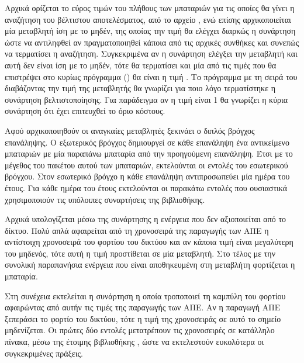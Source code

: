 \documentclass[12pt]{report}
\begin{document}
Αρχικά ορίζεται το εύρος τιμών του πλήθους των μπαταριών για τις οποίες θα γίνει η αναζήτηση του βέλτιστου αποτελέσματος, από το αρχείο {}, ενώ επίσης αρχικοποιείται μία μεταβλητή {} ίση με το 
μηδέν, της οποίας την τιμή θα ελέγχει διαρκώς η συνάρτηση ώστε να αντιληφθεί αν
πραγματοποιηθεί κάποια από τις αρχικές συνθήκες και συνεπώς να τερματίσει η αναζήτηση. Συγκεκριμένα αν η συνάρτηση ελέγξει την μεταβλητή και αυτή δεν είναι ίση με το μηδέν, τότε θα τερματίσει και μία από τις τιμές
που θα επιστρέψει στο κυρίως πρόγραμμα ({}) θα είναι η τιμή {}. Το πρόγραμμα με τη σειρά του διαβάζοντας την τιμή της μεταβλητής θα γνωρίζει για ποιο λόγο τερματίστηκε η συνάρτηση βελτιστοποίησης.
Για παράδειγμα αν η τιμή είναι 1 θα γνωρίζει η κύρια συνάρτηση ότι έχει επιτευχθεί το όριο κόστους.

Αφού αρχικοποιηθούν οι αναγκαίες μεταβλητές ξεκινάει ο διπλός βρόγχος επανάληψης. Ο εξωτερικός βρόγχος δημιουργεί σε κάθε επανάληψη ένα αντικείμενο μπαταριών με μία παραπάνω μπαταρία από την προηγούμενη επανάληψη. Έτσι με το μέγεθος
του πακέτου αυτού των μπαταριών, εκτελούνται οι εντολές του εσωτερικού βρόγχου. Στον εσωτερικό βρόγχο η κάθε επανάληψη αντιπροσωπεύει μία ημέρα του έτους. Για κάθε ημέρα του έτους εκτελούνται οι παρακάτω εντολές που ουσιαστικά 
χρησιμοποιούν τις υπόλοιπες συναρτήσεις της βιβλιοθήκης.

Αρχικά υπολογίζεται μέσω της συνάρτησης {\textbf{{}}} η ενέργεια που δεν αξιοποιείται από το δίκτυο. Πολύ απλά αφαιρείται από τη χρονοσειρά της παραγωγής των ΑΠΕ η αντίστοιχη χρονοσειρά του φορτίου του δικτύου
και αν κάποια τιμή είναι μεγαλύτερη του μηδενός, τότε αυτή η τιμή προστίθεται σε μία μεταβλητή. Στο τέλος με την συνολική παραπανήσια ενέργεια που είναι αποθηκευμένη στη μεταβλήτη φορτίζεται η μπαταρία.

{}

Στη συνέχεια εκτελείται η συνάρτηση {\textbf{{}}} η οποία τροποποιεί τη καμπύλη του φορτίου αφαιρώντας από αυτήν τις τιμές της παραγωγής των ΑΠΕ. Αν η παραγωγή ΑΠΕ ξεπεράσει το φορτίο του δικτύου, τότε η τιμή της 
χρονοσειράς σε αυτό το σημείο μηδενίζεται. Οι πρώτες δύο εντολές μετατρέπουν τις χρονοσειρές σε κατάλληλο πίνακα, μέσω της έτοιμης βιβλιοθήκης {}, ώστε να εκτελεστούν ευκολότερα οι συγκεκριμένες πράξεις.
\end{document}

